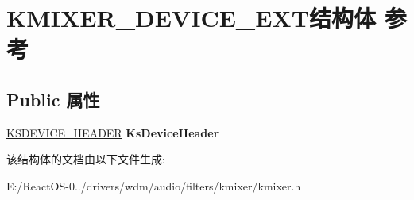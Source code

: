 \hypertarget{struct_k_m_i_x_e_r___d_e_v_i_c_e___e_x_t}{}\section{K\+M\+I\+X\+E\+R\+\_\+\+D\+E\+V\+I\+C\+E\+\_\+\+E\+X\+T结构体 参考}
\label{struct_k_m_i_x_e_r___d_e_v_i_c_e___e_x_t}
\subsection*{Public 属性}
\begin{DoxyCompactItemize}
\item 
\mbox{\label{struct_k_m_i_x_e_r___d_e_v_i_c_e___e_x_t_a1da7edddeaed556d374e0cef0002314c}} 
\hyperlink{interfacevoid}{K\+S\+D\+E\+V\+I\+C\+E\+\_\+\+H\+E\+A\+D\+ER} {\bfseries Ks\+Device\+Header}
\end{DoxyCompactItemize}


该结构体的文档由以下文件生成\+:\begin{DoxyCompactItemize}
\item 
E\+:/\+React\+O\+S-\/0../drivers/wdm/audio/filters/kmixer/kmixer.\+h\end{DoxyCompactItemize}
